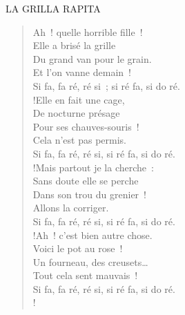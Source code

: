 \documentclass[french,twoside]{book} %
\newenvironment{quoteblock}%
  {\begin{quoting}}
  {\end{quoting}}
\newenvironment{quotebar}{%
    \def\FrameCommand{{\color{rubric!10!}\vrule width 0.5em} \hspace{0.9em}}%
    \def\OuterFrameSep{\itemsep} %
    \MakeFramed {\advance\hsize-\width \FrameRestore}
  }%
  {%
    \endMakeFramed
  }
\renewenvironment{quoteblock}%
  {%
    \savenotes
    \setstretch{0.9}
    \normalfont
    \begin{quotebar}
  }
  {%
    \end{quotebar}
    \spewnotes
  }
\begin{document}
\begin{quoteblock}
LA GRILLA RAPITA\end{quoteblock}

\begin{verse}
\hspace{1em}Ah ! quelle horrible fille !\\
\hspace{1em}Elle a brisé la grille\\
\hspace{1em}Du grand van pour le grain.\\
\hspace{1em}Et l’on vanne demain !\\
Si fa, fa ré, ré si ; si ré fa, si do ré.\\!\hspace{1em}Elle en fait une cage,\\
\hspace{1em}De nocturne présage\\
\hspace{1em}Pour ses chauves-souris !\\
\hspace{1em}Cela n’est pas permis.\\
Si fa, fa ré, ré si, si ré fa, si do ré.\\!\hspace{1em}Mais partout je la cherche :\\
\hspace{1em}Sans doute elle se perche\\
\hspace{1em}Dans son trou du grenier !\\
\hspace{1em}Allons la corriger.\\
Si fa, fa ré, ré si, si ré fa, si do ré.\\!\hspace{1em}Ah ! c’est bien autre chose.\\
\hspace{1em}Voici le pot au rose !\\
\hspace{1em}Un fourneau, des creusets…\\
\hspace{1em}Tout cela sent mauvais !\\
Si fa, fa ré, ré si, si ré fa, si do ré.\\!
\end{verse}
\begin{quoteblock}
 \end{quoteblock}
\end{document}
